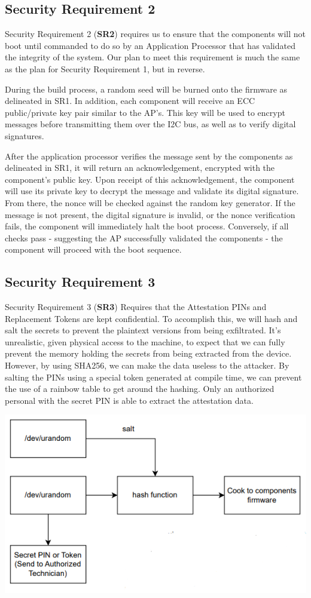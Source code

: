 \documentclass{prace}
\begin{document}
\subsection{Security Requirement 2}
Security Requirement 2 (\textbf{SR2}) requires us to ensure that the components will not boot until commanded
to do so by an Application Processor that has validated the integrity of the system. Our plan to
meet this requirement is much the same as the plan for Security Requirement 1, but in reverse.


During the build process, a random seed will be burned onto the firmware as delineated in 
SR1. In addition, each component will receive an ECC public/private key pair similar to the AP's.
This key will be used to encrypt messages before transmitting them over the I2C bus, as well
as to verify digital signatures.

After the application processor verifies the message sent by the components as delineated
in SR1, it will return an acknowledgement, encrypted with the component's public key. Upon
receipt of this acknowledgement, the component will use its private key to decrypt the 
message and validate its digital signature. From there, the nonce will be checked against
the random key generator. If the message is not present, the digital signature is invalid,
or the nonce verification fails, the component will immediately halt the boot process.
Conversely, if all checks pass - suggesting the AP successfully validated the components -
the component will proceed with the boot sequence.

\subsection{Security Requirement 3}
Security Requirement 3 (\textbf{SR3}) Requires that the Attestation PINs and Replacement Tokens are kept confidential.
To accomplish this, we will hash and salt the secrets to prevent the plaintext versions from being exfiltrated.
It's unrealistic, given physical access to the machine, to expect that we can fully prevent the memory holding
the secrets from being extracted from the device. However, by using SHA256, we can make the data useless to the
attacker. By salting the PINs using a special token generated at compile time, we can prevent the use of a rainbow
table to get around the hashing. Only an authorized personal with the secret PIN is able to extract the attestation data.

\includegraphics{./diagramSR3.png}
\end{document}
